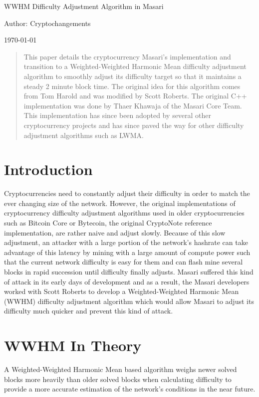 \documentclass{article}
\author{cryptochangements}
\date{\today}
\begin{document}
\noindent\Large WWHM Difficulty Adjustment Algorithm in Masari

\small\noindent Author: Cryptochangements

\noindent\today
\begin{abstract}
This paper details the
cryptocurrency Masari's implementation
and transition to a Weighted-Weighted
Harmonic Mean difficulty adjustment
algorithm to smoothly adjust its difficulty
target so that it maintains a steady 2 minute
block time. The original idea for this
algorithm comes from Tom Harold and
was modified by Scott Roberts. The original C++
implementation was done by Thaer
Khawaja of the Masari Core Team. This
implementation has since been adopted
by several other cryptocurrency projects
and has since paved the way for other
difficulty adjustment algorithms such as
LWMA.
\end{abstract}

\section{Introduction}
Cryptocurrencies need to
constantly adjust their difficulty in order to match the ever changing size of the
network. However, the original
implementations of cryptocurrency
difficulty adjustment algorithms used in
older cryptocurrencies such as Bitcoin Core or Bytecoin,
the original CryptoNote reference
implementation, are rather naive and
adjust slowly. Because of this slow
adjustment, an attacker with a large
portion of the network's hashrate can take
advantage of this latency by mining with a
large amount of compute power such that
the current network difficulty is easy for
them and can flash mine several blocks in
rapid succession until difficulty finally
adjusts. Masari suffered this kind of
attack in its early days of development
and as a result, the Masari developers
worked with Scott Roberts to develop a Weighted-Weighted Harmonic Mean (WWHM)
difficulty adjustment algorithm which
would allow Masari to adjust its difficulty
much quicker and prevent this kind of
attack.

\section{WWHM In Theory}
A Weighted-Weighted
Harmonic Mean based algorithm weighs
newer solved blocks more heavily than
older solved blocks when calculating
difficulty to provide a more accurate
estimation of the network's conditions in
the near future.
\end{document}
